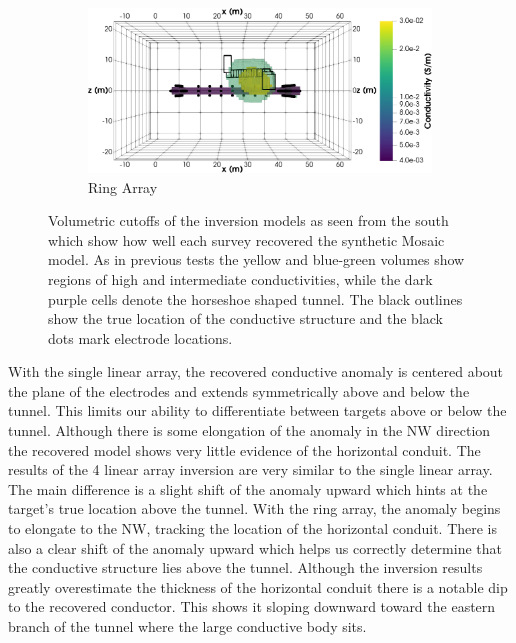 \documentclass[preprint,authoryear,12pt]{elsarticle}
\begin{document}
\begin{figure}[htp]{}
\begin{center}
      \begin{subfigure}{0.48\linewidth}
         \label{fig:SynthMosaic_Horseshoe_Ring_South}
         \includegraphics[trim=0cm 0cm 0cm 0cm, clip=true,width=\linewidth]{./figures/Fig16c.png}
         \caption{Ring Array}
      \end{subfigure}
      \vspace{0.2cm}
   \end{center}
\vspace{-0.4cm}
\caption{Volumetric cutoffs of the inversion models as seen from the south which show how well each survey recovered the synthetic Mosaic model. As in previous tests the yellow and blue-green volumes show regions of high and intermediate conductivities, while the dark purple cells denote the horseshoe shaped tunnel. The black outlines show the true location of the conductive structure and the black dots mark electrode locations.}
\label{fig:Horseshoe_SynthMosaic2_Isosurfaces_South}
\end{figure}


With the single linear array, the recovered conductive anomaly is centered about the plane of the electrodes and extends symmetrically above and below the tunnel. This limits our ability to differentiate between targets above or below the tunnel. Although there is some elongation of the anomaly in the NW direction the recovered model shows very little evidence of the horizontal conduit. The results of the 4 linear array inversion are very similar to the single linear array. The main difference is a slight shift of the anomaly upward which hints at the target's true location above the tunnel. With the ring array, the anomaly begins to elongate to the NW, tracking the location of the horizontal conduit. There is also a clear shift of the anomaly upward which helps us correctly determine that the conductive structure lies above the tunnel. Although the inversion results greatly overestimate the thickness of the horizontal conduit there is a notable dip to the recovered conductor. This shows it sloping downward toward the eastern branch of the tunnel where the large conductive body sits.
\end{document}
